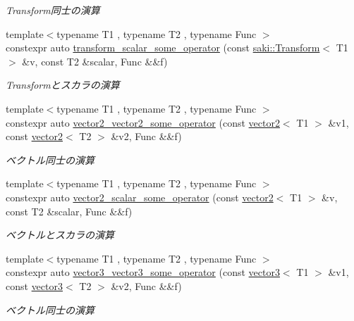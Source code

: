 \begin{DoxyCompactItemize}
\begin{DoxyCompactList}\small\item\em Transform同士の演算 \end{DoxyCompactList}\item 
{\footnotesize template$<$typename T1 , typename T2 , typename Func $>$ }\\constexpr auto \mbox{\hyperlink{namespacesaki_1_1details_a2f5694f4bcf7f45e946384285562521e}{transform\+\_\+scalar\+\_\+some\+\_\+operator}} (const \mbox{\hyperlink{classsaki_1_1_transform}{saki\+::\+Transform}}$<$ T1 $>$ \&v, const T2 \&scalar, Func \&\&f)
\begin{DoxyCompactList}\small\item\em Transformとスカラの演算 \end{DoxyCompactList}\item 
{\footnotesize template$<$typename T1 , typename T2 , typename Func $>$ }\\constexpr auto \mbox{\hyperlink{namespacesaki_1_1details_a83d5020a51b57f3b8f8166e785861cc5}{vector2\+\_\+vector2\+\_\+some\+\_\+operator}} (const \mbox{\hyperlink{classsaki_1_1vector2}{vector2}}$<$ T1 $>$ \&v1, const \mbox{\hyperlink{classsaki_1_1vector2}{vector2}}$<$ T2 $>$ \&v2, Func \&\&f)
\begin{DoxyCompactList}\small\item\em ベクトル同士の演算 \end{DoxyCompactList}\item 
{\footnotesize template$<$typename T1 , typename T2 , typename Func $>$ }\\constexpr auto \mbox{\hyperlink{namespacesaki_1_1details_a02e93149670af3f28e74fcb7dbcf4fa9}{vector2\+\_\+scalar\+\_\+some\+\_\+operator}} (const \mbox{\hyperlink{classsaki_1_1vector2}{vector2}}$<$ T1 $>$ \&v, const T2 \&scalar, Func \&\&f)
\begin{DoxyCompactList}\small\item\em ベクトルとスカラの演算 \end{DoxyCompactList}\item 
{\footnotesize template$<$typename T1 , typename T2 , typename Func $>$ }\\constexpr auto \mbox{\hyperlink{namespacesaki_1_1details_a2febe2ef2ca8b6222cd2edd5c82863ad}{vector3\+\_\+vector3\+\_\+some\+\_\+operator}} (const \mbox{\hyperlink{classsaki_1_1vector3}{vector3}}$<$ T1 $>$ \&v1, const \mbox{\hyperlink{classsaki_1_1vector3}{vector3}}$<$ T2 $>$ \&v2, Func \&\&f)
\begin{DoxyCompactList}\small\item\em ベクトル同士の演算 \end{DoxyCompactList}\item 

\end{DoxyCompactItemize}
